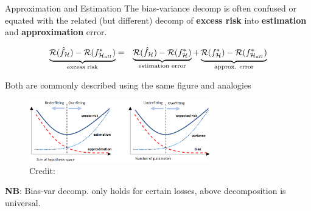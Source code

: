 \documentclass[11pt,compress,t,notes=noshow, xcolor=table]{beamer}
\begin{document}
\begin{vbframe}{Approximation and Estimation  }
The bias-variance decomp is often confused or equated with the related (but different) decomp of \textbf{excess risk} into \textbf{estimation} and \textbf{approximation} error.
\vspace{-0.3cm}

\begin{eqnarray*}
    \underbrace{\mathcal{R}(\hat f_{\mathcal{H}}) - \mathcal{R}(f^{\ast}_{\mathcal{H}_{all}})}_{\text{excess risk}} &=& \underbrace{\mathcal{R}(\hat f_{\mathcal{H}}) - \mathcal{R}(f^{\ast}_{\mathcal{H}})}_{\text{estimation error}} + \underbrace{\mathcal{R}(f^{\ast}_{\mathcal{H}}) -  \mathcal{R}(f^{\ast}_{\mathcal{H}_{all}})}_{\text{approx. error}} 
\end{eqnarray*}

Both are commonly described using the same figure and analogies
\vspace{-0.1cm}
\begin{figure}
    \centering
    \includegraphics[width = 0.7\textwidth]{figure_man/biasvar-vs-estapprox-tradeoff.png}
    \tiny{\\ Credit: \cite{BROWN2024BIAS}}
  \end{figure}

{\footnotesize \textbf{NB}: Bias-var decomp. only holds for certain losses, above decomposition is universal.}

\end{vbframe}

\end{document}
